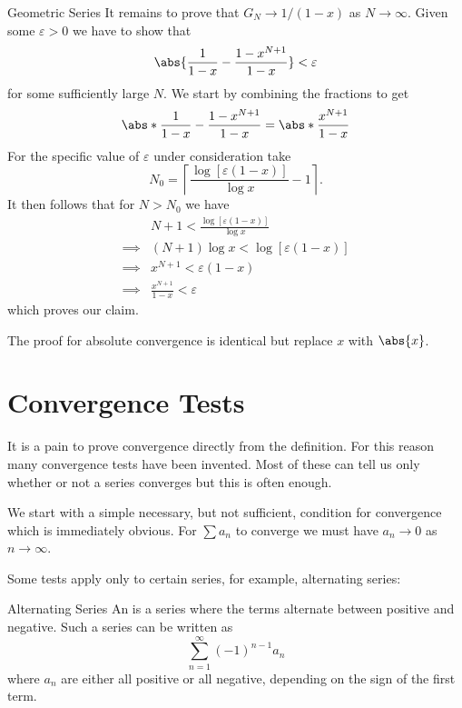 \documentclass[fleqn]{NotesClass}
\begin{document}
\begin{exm}{Geometric Series}{}
        It remains to prove that \(G_N \to 1/(1 - x)\) as \(N \to \infty\).
        Given some \(\varepsilon > 0\) we have to show that
        \begin{equation}
            \abs{\frac{1}{1 - x} - \frac{1 - x^{N+1}}{1 - x}} < \varepsilon
        \end{equation}
        for some sufficiently large \(N\).
        We start by combining the fractions to get
        \begin{equation}
            \abs*{\frac{1}{1 - x} - \frac{1 - x^{N+1}}{1 - x}} = \abs*{\frac{x^{N+1}}{1 - x}}
        \end{equation}
        For the specific value of \(\varepsilon\) under consideration take
        \begin{equation}
            N_0 = \left\lceil \frac{\log[\varepsilon(1 - x)]}{\log x} - 1 \right\rceil.
        \end{equation}
        It then follows that for \(N > N_0\) we have
        \begin{align}
            &N + 1 < \frac{\log[\varepsilon(1 - x)]}{\log x}\\
            \implies &(N + 1)\log x <  \log[\varepsilon(1-x)]\\
            \implies &x^{N+1} < \varepsilon(1 - x)\\
            \implies &\frac{x^{N+1}}{1 - x} < \varepsilon
        \end{align}
        which proves our claim.
        
        The proof for absolute convergence is identical but replace \(x\) with \(\abs{x}\).
    \end{exm}
    
    \section{Convergence Tests}
    It is a pain to prove convergence directly from the definition.
    For this reason many convergence tests have been invented.
    Most of these can tell us only whether or not a series converges but this is often enough.
    
    We start with a simple necessary, but not sufficient, condition for convergence which is immediately obvious.
    For \(\sum a_n\) to converge we must have \(a_n \to 0\) as \(n \to \infty\).
    
    Some tests apply only to certain series, for example, alternating series:
    \begin{dfn}{Alternating Series}{}
        An  is a series where the terms alternate between positive and negative.
        Such a series can be written as
        \begin{equation}
            \sum_{n=1}^{\infty} (-1)^{n-1}a_n
        \end{equation}
        where \(a_n\) are either all positive or all negative, depending on the sign of the first term.
    \end{dfn}
    
\end{document}
